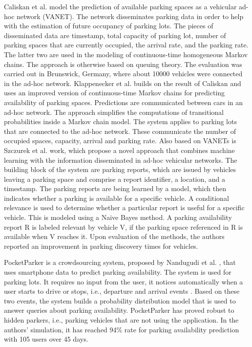 Caliskan et al. \cite{caliskan} model the prediction of available parking spaces as a vehicular ad-hoc network (VANET). The network disseminates parking data in order to help with the estimation of future occupancy of parking lots. The pieces of disseminated data are timestamp, total capacity of parking lot, number of parking spaces that are currently occupied, the arrival rate, and the parking rate. The latter two are used in the modeling of continuous-time homogeneous Markov chains. The approach is otherwise based on queuing theory. The evaluation was carried out in Brunswick, Germany, where about 10000 vehicles were connected in the ad-hoc network. Klappenecker et al. \cite{klappenecker} builds on the result of Caliskan and uses an improved version of continuous-time Markov chains for predicting availability of parking spaces. Predictions are communicated between cars in an ad-hoc network. The approach simplifies the computations of transitional probabilities inside a Markov chain model. The system applies to parking lots that are connected to the ad-hoc network. These communicate the number of occupied spaces, capacity, arrival and parking rate. Also based on VANETs is Szczurek et al. \cite{szczurek} work, which propose a novel approach that combines machine learning with the information disseminated in ad-hoc vehicular networks. The building block of the system are parking reports, which are issued by vehicles leaving a parking space and comprise a report identifier, a location, and a timestamp. The parking reports are being learned by a model, which then indicates whether a parking is available for a specific vehicle. A conditional relevance is used to determine whether a particular report is useful for a specific vehicle. This is modeled using a Naive Bayes method. A parking availability report R is labeled relevant by vehicle V, if the parking space referenced in R is available when V reaches it. Upon evaluation of the methods, the authors reported an improvement in parking discovery times for vehicles.

PocketParker is a crowdsourcing system, proposed by Nandugudi et al. \cite{nandugudi}, that uses smartphone data to predict parking availability. The system is used for parking lots. It requires no input from the user, it notices automatically when a user starts to drive or stops, i.e., departure and arrival events
. Based on these two events, the system builds a probability distribution model that is used to answer queries about parking availability. PocketParker has proved robust to hidden parkers, i.e., parking vehicles that are not using the application. In the authors' simulation, it has reached 94\% rate for parking availability prediction with 105 users over 45 days.

